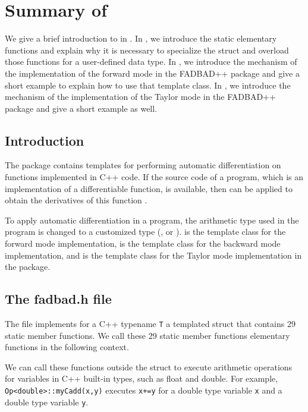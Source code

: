 
\chapter{Summary of \FADBADpp}\label{ch:summary}

We give a brief introduction to \FADBADpp in . In , we introduce the static elementary functions and explain why it is necessary to specialize the struct and overload those functions for a user-defined data type. In , we introduce the mechanism of the implementation of the forward mode in the FADBAD++ package and give a short example to explain how to use that template class. In , we introduce the mechanism of the implementation of the Taylor mode in the FADBAD++ package and give a short example as well.


\section{Introduction}\label{sc:introfadbad}
The \FADBADpp package contains templates for performing automatic differentiation on functions implemented in C++ code. If the source code of a program, which is an implementation of a differentiable function, is available, then \FADBADpp can be applied to obtain the derivatives of this function \cite{FADBAD++}.

To apply automatic differentiation in a program, the arithmetic type used in the program  is changed to a customized type (\Fn, \B or \T). \F is the template class for the forward mode implementation, \B is the template class for the backward mode implementation, and \T is the template class for the Taylor mode implementation in the \FADBADpp package. 

\section{The fadbad.h file}\label{sc:fadbad}
The file \fadbad implements for a C++ typename {\tt T} a templated struct \Op that contains 29 static member functions. We call these 29 static member functions elementary functions in the following context.

We can call these functions outside the struct \Op to execute arithmetic operations for variables in C++ built-in types, such as float and double.
For example, {\tt Op<double>::myCadd(x,y)} executes {\tt x+=y} for a double type variable {\tt x} and a double type variable {\tt y}.


